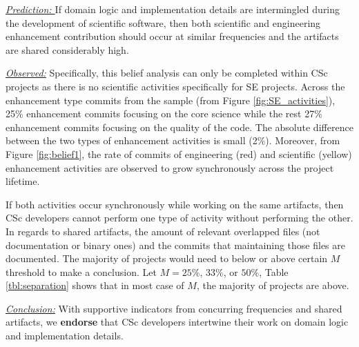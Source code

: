 \documentclass[conference,10pt]{IEEEtran}
\newenvironment{RQ}{\vspace{1mm}\begin{tcolorbox}[enhanced,width=3.4in,size=fbox,colback=red!5!white,drop shadow southeast,sharp corners]}{\end{tcolorbox}}
\begin{document}
\noindent \textit{\underline{Prediction: }} If domain logic and implementation details are intermingled during the development of scientific software, then both scientific and engineering enhancement contribution should occur at similar frequencies and the artifacts are shared considerably high. 



\noindent \textit{\underline{Observed:}} Specifically, this belief analysis can only be completed within CSc projects as there is no scientific activities specifically for SE projects. Across the enhancement type commits from the sample (from Figure \ref{fig:SE_activities}), 25\% enhancement commits focusing on the core science while the rest 27\% enhancement commits focusing on the quality of the code. The absolute difference between the two types of enhancement activities is small (2\%). Moreover, from Figure \ref{fig:belief1}, the rate of commits of engineering (red) and scientific (yellow) enhancement activities are observed to grow synchronously across the project lifetime. 

If both activities occur synchronously while working on the same artifacts, then CSc developers cannot perform one type of activity without performing the other. In regards to shared artifacts, the amount of relevant overlapped files (not documentation or binary ones) and the commits that maintaining those files are documented. The majority of projects would need to below or above certain $M$ threshold to make a conclusion. Let $M = 25\%$, $33\%$, or $50\%$, Table \ref{tbl:separation} shows that in most case of $M$, the majority of projects are above. 



\begin{RQ}
\textit{\underline{Conclusion:}} With supportive indicators from concurring frequencies and shared artifacts,  
we \textbf{endorse}  that CSc developers intertwine their work
on domain logic and implementation details.
\end{RQ}
\end{document}
